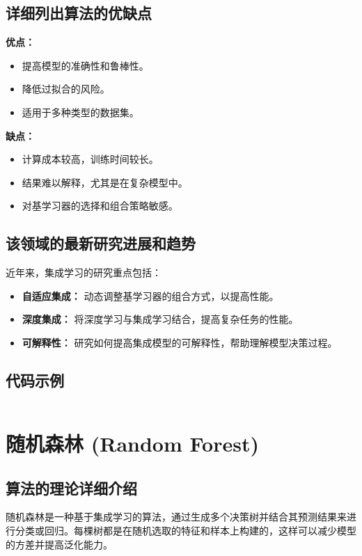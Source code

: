 \subsection*{详细列出算法的优缺点}
\textbf{优点：}
\begin{itemize}
    \item 提高模型的准确性和鲁棒性。
    \item 降低过拟合的风险。
    \item 适用于多种类型的数据集。
\end{itemize}

\textbf{缺点：}
\begin{itemize}
    \item 计算成本较高，训练时间较长。
    \item 结果难以解释，尤其是在复杂模型中。
    \item 对基学习器的选择和组合策略敏感。
\end{itemize}

\subsection*{该领域的最新研究进展和趋势}
近年来，集成学习的研究重点包括：
\begin{itemize}
    \item \textbf{自适应集成：} 动态调整基学习器的组合方式，以提高性能。
    \item \textbf{深度集成：} 将深度学习与集成学习结合，提高复杂任务的性能。
    \item \textbf{可解释性：} 研究如何提高集成模型的可解释性，帮助理解模型决策过程。
\end{itemize}
\subsection*{代码示例}
\begin{lstlisting}

\end{lstlisting}


\section{随机森林 (Random Forest)}
\subsection*{算法的理论详细介绍}
随机森林是一种基于集成学习的算法，通过生成多个决策树并结合其预测结果来进行分类或回归。每棵树都是在随机选取的特征和样本上构建的，这样可以减少模型的方差并提高泛化能力。


